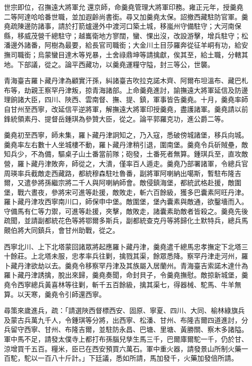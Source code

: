 \begin{pinyinscope}
世宗即位，召撫遠大將軍允還京師，命羹堯管理大將軍印務。雍正元年，授羹堯二等阿達哈哈番世職，並加遐齡尚書銜。尋又加羹堯太保。詔撤西藏駐防官軍。羹堯疏陳邊防諸事，請於打箭爐邊外中渡河口築土城，移嵐州守備駐守；大河南保縣，移威茂營千總駐守；越巂衛地方寥闊，蠻、惈出沒，改設游擊，增兵駐守；松潘邊外諸番，阿樹為最要，給長官司職銜；大金川土目莎羅奔從征羊峒有功，給安撫司職銜；烏蒙蠻目達木等兇暴，土舍祿鼎坤等請擒獻，俟其至，給土職，分轄其地。下部議，從之。論平西藏功，以羹堯運糧守隘，封三等公，世襲。

青海臺吉羅卜藏丹津為顧實汗孫，糾諸臺吉吹拉克諾木齊、阿爾布坦溫布、藏巴札布等，劫親王察罕丹津叛，掠青海諸部。上命羹堯進討，諭撫遠大將軍延信及防邊理餉諸大臣，四川、陜西、雲南督、撫、提、鎮，軍事皆告羹堯。十月，羹堯率師自甘州至西寧，改延信平逆將軍，解撫遠大將軍印授羹堯，盡護諸軍。羹堯請以前鋒統領素丹、提督岳鍾琪為參贊大臣，從之。論平郭羅克功，進公爵二等。

羹堯初至西寧，師未集，羅卜藏丹津詗知之，乃入寇，悉破傍城諸堡，移兵向城。羹堯率左右數十人坐城樓不動，羅卜藏丹津稍引退，圍南堡。羹堯令兵斫賊壘，敵知兵少，不為備，驅桌子山土番當前隊；砲發，土番死者無算。鍾琪兵至，直攻敵營，羅卜藏丹津敗奔，師從之，大潰，僅率百人遁走。羹堯乃部署諸軍，令總兵官周瑛率兵截敵走西藏路，都統穆森駐吐魯番，副將軍阿喇納出噶斯，暫駐布隆吉爾，又遣參將孫繼宗將二千人與阿喇納師會。敵侵鎮海堡，都統武格赴援，敵圍堡，戰六晝夜，參將宋可進等赴援，敵敗走，斬六百餘級，獲多巴囊素阿旺丹津。羅卜藏丹津攻西寧南川口，師保申中堡。敵圍堡，堡內囊素與敵通，欲鑿墻而入。守備馬有仁等力禦，可進等赴援，夾擊，敵敗走，諸囊素助敵者皆殺之。羹堯先後疏聞，並請副都統花色等將鄂爾多斯兵，副都統查克丹等將歸化土默特兵，總兵馬覿伯將大同鎮兵，會甘州助戰，從之。

西寧北川、上下北塔蒙回諸眾將起應羅卜藏丹津，羹堯遣千總馬忠孝撫定下北塔三十餘莊。上北塔未服，忠孝率兵往剿，擒戮其渠，餘眾悉降。察罕丹津走河州，羅卜藏丹津欲劫以去。羹堯令移察罕丹津及其族屬入居蘭州。青海臺吉索諾木達什為羅卜藏丹津誘擒，脫出來歸，羹堯奏聞，命封貝子，令羹堯撫慰。敵掠新城堡，羹堯令西寧總兵黃喜林等往剿，斬千五百餘級，擒其渠七，得器械、駝馬、牛羊無算。以天寒，羹堯令引師還西寧。

尋策來歲進兵，疏：「請選陜西督標西安、固原、寧夏、四川、大同、榆林綠旗兵及蒙古兵萬九千人，令鍾琪等分將，出西寧、松潘、甘州、布隆吉爾四道進討，分兵留守西寧、甘州、布隆吉爾，並駐防永昌、巴塘、里塘、黃勝關、察木多諸隘。軍中馬不足，請發太僕寺上都打布孫腦兒孳生馬三千，巴爾庫爾駝一千，仍於甘、涼增買千五百。糧米，臣已在西安預買六萬石。軍中重火器，請發景山所制火藥一百駝，駝以一百八十斤計。」下廷議，悉如所請，馬加發千，火藥加發倍所請。


\end{pinyinscope}
